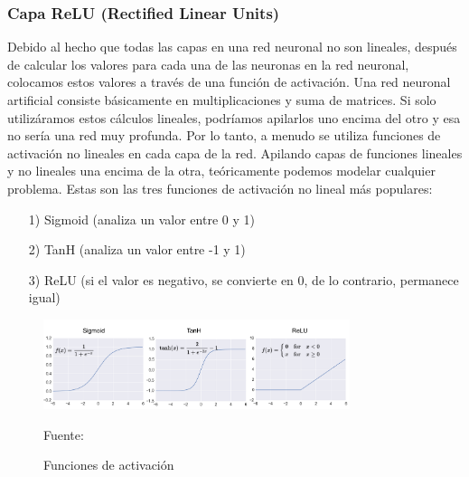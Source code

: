 	\subsubsection  {Capa ReLU (Rectified Linear Units)}
		\vskip -0.2cm 
		Debido al hecho que todas las capas en una red neuronal no son lineales, después de calcular los valores para cada una de las neuronas en la red neuronal, colocamos estos valores a través de una función de activación. Una red neuronal artificial consiste básicamente en multiplicaciones y suma de matrices. Si solo utilizáramos estos cálculos lineales, podríamos apilarlos uno encima del otro y esa no sería una red muy profunda. Por lo tanto, a menudo se utiliza funciones de activación no lineales en cada capa de la red. Apilando capas de funciones lineales y no lineales una encima de la otra, teóricamente podemos modelar cualquier problema.
		\vskip 0.2cm 
		Estas son las tres funciones de activación no lineal más populares:
		\begin{enumerate}
		\item[1)] Sigmoid (analiza un valor entre 0 y 1)  \vspace{-0.5em}
		\item[2)] TanH (analiza un valor entre -1 y 1) \vspace{-0.5em}
		\item[3)] ReLU (si el valor es negativo, se convierte en 0, de lo contrario, permanece igual) \vspace{-0.5em}
		\end{enumerate}

		\begin{figure}[H]
		\begin{center}
		\includegraphics[width=0.8\textwidth]{images/marcoteorico/activfunct}
		\end{center}
		\begin{center}
		\caption{\small{Funciones de activación}}
		\vskip -0.2cm  
		{\small{Fuente: \cite{Adil}}}
		\end{center}
		\vspace{-1.5em}
		\end{figure}

